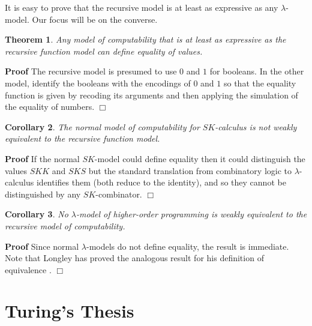 \documentclass[a4paper]{article}
\newtheorem{theorem}{Theorem}
\newtheorem{corollary}[theorem]{Corollary}
\newenvironment{proof}
	{\par\noindent\upshape\textbf{Proof}\quad}
	{\hspace*{\fill}$\Box$}
\begin{document}
It is easy to prove that the recursive model is at least as expressive as
any $\lambda$-model. Our focus will be on the converse. 

\begin{theorem}
  Any model of computability that is at least as  expressive as the
  recursive function model can define equality of values.
\end{theorem}

\begin{proof}
  The recursive model is presumed to use $0$ and $1$ for booleans.  In
  the other model, identify the booleans with the encodings of $0$ and
  $1$ so that the equality function is given by recoding its arguments
  and then applying the simulation of the equality of numbers.
\end{proof}

\begin{corollary}
\label{cor:SK-inequivalent}
The normal model of computability for $SK\!$-calculus is not weakly equivalent to the recursive
function model.
\end{corollary}

\begin{proof}
  If the normal $SK$-model could define equality then it could distinguish
  the values $SKK$ and $SKS$ but the standard translation from
  combinatory logic to $\lambda$-calculus identifies them (both reduce to
  the identity), and so they cannot be distinguished by any
  $SK$-combinator. 
\end{proof}


\begin{corollary}
\label{cor:lambda-inequivalent}
No $\lambda$-model of higher-order programming is weakly equivalent to the
recursive model of computability.
\end{corollary}

\begin{proof}
  Since normal $\lambda$-models do not define equality, the result is
  immediate. Note that Longley has proved the analogous result for his
  definition of equivalence \cite{Longley14}.
\end{proof}




\section{Turing's Thesis}  
\label{sec:Turing}
\end{document}
